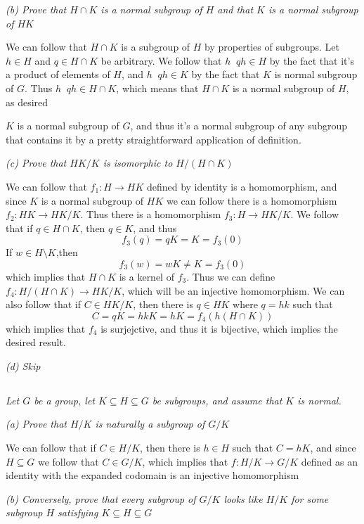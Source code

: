 \documentclass[11pt,oneside,titlepage]{book}
\DeclareMathOperator \inv {^{-1}}
\begin{document}
\textit{(b) Prove that $H \cap K$ is a normal subgroup of $H$ and that $K$
  is a normal subgroup of $HK$}

We can follow that $H \cap K$ is a subgroup of $H$ by properties
of subgroups.
Let $h \in H$ and $q \in H \cap K$ be arbitrary. We follow that
$h\inv q h \in H$ by the fact that it's a product of elements of $H$,
and $h\inv q h \in K$ by the fact that $K$ is normal subgroup of $G$.
Thus $h\inv q h \in H \cap K$, which means that $H \cap K$ is a
normal subgroup of $H$, as desired

$K$ is a normal subgroup of $G$, and thus it's a normal subgroup of any
subgroup that contains it by a pretty straightforward application
of definition.

\textit{(c) Prove that $HK/K$ is isomorphic to $H/(H \cap K)$}

We can follow that $f_1: H \to HK$ defined by identity is a homomorphism,
and since $K$ is a normal subgroup of $HK$ we can follow there is
a homomorphism $f_2: HK \to HK/K$. Thus there is a homomorphism
$f_3: H \to HK/K$. We follow that if
$q \in H \cap K$, then $q \in K$, and thus
$$f_3(q) = qK = K = f_3(0)$$
If $w \in H \setminus K$,then
$$f_3(w) = wK \neq K = f_3(0)$$
which implies that $H \cap K$ is a kernel of $f_3$. Thus we can define
$f_4: H/(H \cap K) \to HK / K$, which will be an injective homomorphism.
We can also follow that if $C \in HK/K$, then there is $q \in HK$
where $q = hk$ such that
$$C = qK = hkK = hK = f_4(h(H \cap K))$$
which implies that $f_4$ is surjejctive, and thus it is bijective,
which implies the desired result.

\textit{(d) Skip}

\subsection{}

\textit{Let $G$ be a group, let $K \subseteq H \subseteq G$ be
  subgroups, and assume that $K$ is normal.}

\textit{(a) Prove that $H/K$ is naturally a subgroup of $G/K$}

We can follow that if $C \in H/K$, then there is $h \in H$ such that
$C = hK$, and since $H \subseteq G$ we follow that $C \in G/K$, which
implies that $f: H/K \to G/K$ defined as an identity with the expanded
codomain is an injective homomorphism

\textit{(b) Conversely, prove that every subgroup of $G/K$ looks like
  $H/K$ for some subgroup $H$ satisfying $K \subseteq H \subseteq G$}
\end{document}
